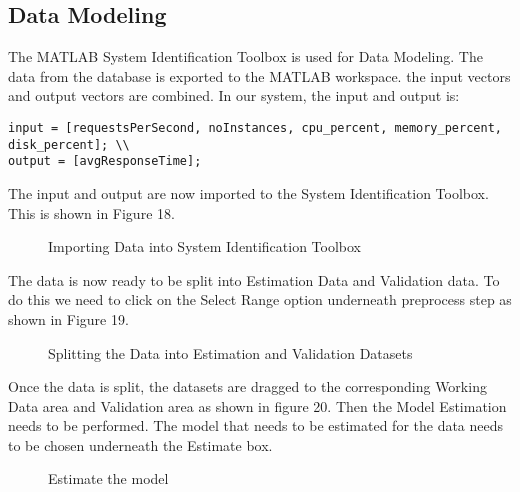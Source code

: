 \documentclass[article,type=msc,colorback,12pt,accentcolor=tud7b]{tudthesis}
\begin{document}
	\subsection{Data Modeling}
 
 The MATLAB System Identification Toolbox is used for Data Modeling. The data from the database is exported to the MATLAB workspace. the input vectors and output vectors are combined. In our system, the input and output is:
 \begin{lstlisting} 
input = [requestsPerSecond, noInstances, cpu_percent, memory_percent, disk_percent]; \\
output = [avgResponseTime];
 \end{lstlisting}
 
 The input and output are now imported to the System Identification Toolbox. This is shown in Figure 18.
 
  \begin{figure}[h]
  	\begin{center}
  		\makebox[\textwidth]{\texttt{[image: D6]}}
  	\end{center}
  	\caption{Importing Data into System Identification Toolbox}
  \end{figure}	
  
  The data is now ready to be split into Estimation Data and Validation data. To do this we need to click on the Select Range option underneath preprocess step as shown in Figure 19. 
  
    \begin{figure}[h]
    	\begin{center}
    		\makebox[\textwidth]{\texttt{[image: D7]}}
    	\end{center}
    	\caption{Splitting the Data into Estimation and Validation Datasets}
    \end{figure}
 
 Once the data is split, the datasets are dragged to the corresponding Working Data area and Validation area as shown in figure 20. Then the Model Estimation needs to be performed. The model that needs to be estimated for the data needs to be chosen underneath the Estimate box.
 
     \begin{figure}[h]
     	\begin{center}
     		\makebox[\textwidth]{\texttt{[image: D8]}}
     	\end{center}
     	\caption{Estimate the model}
     \end{figure}
 
\end{document}

